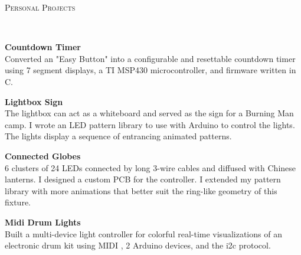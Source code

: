 \documentclass{article}
\newenvironment{changemargin}[2]{%
  \begin{list}{}{%
    \setlength{\topsep}{0pt}%
    \setlength{\leftmargin}{#1}%
    \setlength{\rightmargin}{#2}%
    \setlength{\listparindent}{\parindent}%
    \setlength{\itemindent}{\parindent}%
    \setlength{\parsep}{\parskip}%
  }%
  \item[]}{\end{list}
}
\newcommand{\lineover}{
	\begin{changemargin}{-0.05in}{-0.05in}
		\vspace*{-8pt}
		\hrulefill \\
		\vspace*{-2pt}
	\end{changemargin}
}
\newcommand{\header}[1]{
	\begin{changemargin}{-0.5in}{-0.5in}
		\scshape{#1}\\
  	\lineover
	\end{changemargin}
}
\newenvironment{body} {
	\vspace*{-16pt}
	\begin{changemargin}{-0.25in}{-0.5in}
  }	
	{\end{changemargin}
}
\begin{document}
\header{Personal Projects}
\begin{body}
	\vspace{20pt}

	\textbf{Countdown Timer}\\
	Converted an "Easy Button" into a configurable and resettable countdown timer 
	using 7 segment displays, a TI MSP430 microcontroller, and firmware written in C.
	

	
	\vspace{8pt}
	\textbf{Lightbox Sign}\\
	The lightbox can act as a whiteboard and served as the sign for a Burning Man camp. I wrote an LED pattern library to use with Arduino to control the lights. The lights display a sequence of entrancing animated patterns.
	
	\vspace{8pt}
	\textbf{Connected Globes}\\
	6 clusters of 24 LEDs connected by long 3-wire cables and diffused with Chinese lanterns. I designed a custom PCB for the controller. I extended my pattern library with more animations that better suit the ring-like geometry of this fixture.
	
	\vspace{8pt}
	\textbf{Midi Drum Lights}\\
	Built a multi-device light controller for colorful real-time visualizations of an electronic drum kit using MIDI , 2 Arduino devices, and the i2c protocol.
		
\end{body}
\end{document}
